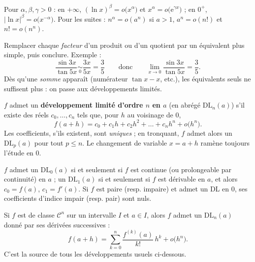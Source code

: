 \begin{propriete}
Pour $\alpha,\beta,\gamma>0$ : en $+\infty$,
$(\ln x)^{\beta}=o\bigl(x^{\alpha}\bigr)$ et $x^{\alpha}=o\bigl(\mathrm{e}^{\gamma x}\bigr)$ ;
en $0^{+}$, $\lvert\ln x\rvert^{\beta}=o\bigl(x^{-\alpha}\bigr)$. Pour les suites :
$n^{\alpha}=o(a^{n})$ si $a>1$, $a^{n}=o(n!)$ et $n!=o(n^{n})$.
\end{propriete}

\begin{savoirfaire}
Remplacer chaque \emph{facteur} d'un produit ou d'un quotient par un
équivalent plus simple, puis conclure. Exemple :
\[
\frac{\sin 3x}{\tan 5x}\underset{0}{\sim}\frac{3x}{5x}=\frac35
\qquad\text{donc}\qquad
\lim_{x\to0}\frac{\sin 3x}{\tan 5x}=\frac35.
\]
Dès qu'une \emph{somme} apparaît (numérateur $\tan x-x$, etc.), les
équivalents seuls ne suffisent plus : on passe aux développements limités.
\end{savoirfaire}


\begin{definition}
$f$ admet un \textbf{développement limité d'ordre $n$ en $a$} (en abrégé
$\mathrm{DL}_{n}(a)$) s'il existe des réels $c_0,\dots,c_n$ tels que, pour
$h$ au voisinage de $0$,
\[
f(a+h)=c_0+c_1h+c_2h^{2}+\dots+c_nh^{n}+o\bigl(h^{n}\bigr).
\]
Les coefficients, s'ils existent, sont \emph{uniques} ; en tronquant, $f$
admet alors un $\mathrm{DL}_{p}(a)$ pour tout $p\leqslant n$. Le changement
de variable $x=a+h$ ramène toujours l'étude en $0$.
\end{definition}

\begin{propriete}
$f$ admet un $\mathrm{DL}_{0}(a)$ si et seulement si $f$ est continue
(ou prolongeable par continuité) en $a$ ; un $\mathrm{DL}_{1}(a)$ si et
seulement si $f$ est dérivable en $a$, et alors $c_0=f(a)$, $c_1=f'(a)$.
Si $f$ est paire (resp. impaire) et admet un DL en $0$, ses coefficients
d'indice impair (resp. pair) sont nuls.
\end{propriete}

\begin{theoreme}
Si $f$ est de classe $\mathcal{C}^{n}$ sur un intervalle $I$ et $a\in I$,
alors $f$ admet un $\mathrm{DL}_{n}(a)$ donné par ses dérivées successives :
\[
f(a+h)=\sum_{k=0}^{n}\frac{f^{(k)}(a)}{k!}\,h^{k}+o\bigl(h^{n}\bigr).
\]
C'est la source de tous les développements usuels ci-dessous.
\end{theoreme}

